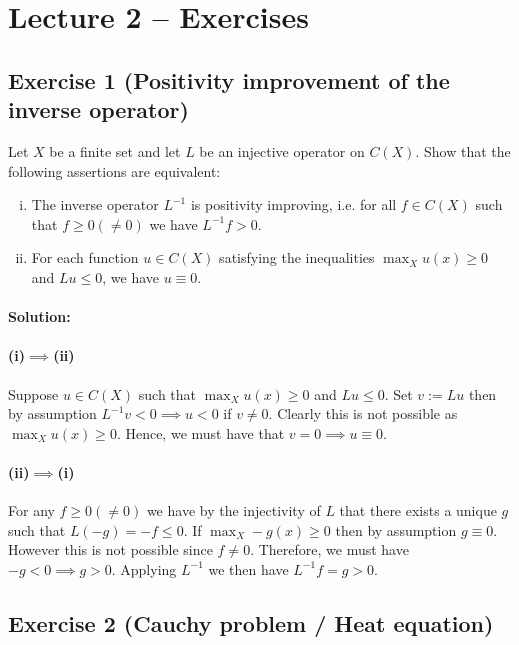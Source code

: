 \section{Lecture 2 -- Exercises}

\subsection{Exercise 1 (Positivity improvement of the inverse operator)}

Let $X$ be a finite set and let $L$ be an injective operator on $C(X)$. Show that the following assertions are equivalent:
\begin{enumerate}[(i)]
	\item
		The inverse operator $L^{-1}$ is positivity improving, i.e. for all $f\in C(X)$ such that $f\geq 0(\neq 0)$ we have $L^{-1}f>0$.
	\item
		For each function $u\in C(X)$ satisfying the inequalities $\max_{X} u(x)\geq 0$ and $Lu\leq 0$, we have $u\equiv 0$.
\end{enumerate}

\paragraph{Solution:}

\paragraph{(i)$\implies$(ii)}
Suppose $u\in C(X)$ such that $\max_{X}u(x)\geq 0$ and $Lu\leq 0$. Set $v:=Lu$ then by assumption $L^{-1}v<0\implies u<0$ if $v\neq 0$. Clearly this is not possible as $\max_{X}u(x)\geq 0$. Hence, we must have that $v=0\implies u\equiv 0$.

\paragraph{(ii)$\implies$(i)}
For any $f\geq 0(\neq 0)$ we have by the injectivity of $L$ that there exists a unique $g$ such that $L(-g)=-f\leq 0$. If $\max_{X}-g(x)\geq 0$ then by assumption $g\equiv 0$. However this is not possible since $f\neq 0$. Therefore, we must have $-g<0\implies g>0$. Applying $L^{-1}$ we then have $L^{-1}f=g>0$.

\subsection{Exercise 2 (Cauchy problem / Heat equation)}

